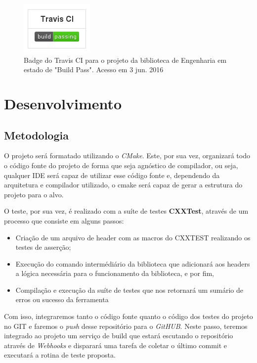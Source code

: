 \documentclass[
	article,			%
	12pt,				%
	oneside,			%
	a4paper,			%
	english,			
	brazil,
	sumario=tradicional
	]{abntex2}
\begin{document}
\begin{figure}[!h]
\centering
\includegraphics[scale=1]{images/travisci_badge.png}
\caption{Badge do Travis CI para o projeto da biblioteca de Engenharia em estado de "Build Pass". Acesso em 3 jun. 2016}
\label{travisci_badge}
\end{figure}


\pagebreak
\section{Desenvolvimento}


\subsection{Metodologia}

O projeto será formatado utilizando o \textit{CMake}. Este, por sua vez, organizará todo o código fonte do projeto de forma que seja agnóstico de compilador, ou seja, qualquer IDE será capaz de utilizar esse código fonte e, dependendo da arquitetura e compilador utilizado, o cmake será capaz de gerar a estrutura do projeto para o alvo. 

O teste, por sua vez, é realizado com a suíte de testes \textbf{CXXTest}, através de um processo que consiste em alguns passos:

\begin{itemize}
	\item{Criação de um arquivo de header com as macros do CXXTEST realizando os testes de asserção;}
	\item{Execução do comando intermédiário da biblioteca que adicionará aos headers a lógica necessária para o funcionamento da biblioteca, e por fim,}
	\item{Compilação e execução da suíte de testes que nos retornará um sumário de erros ou sucesso da ferramenta}
\end{itemize}

Com isso, integraremos tanto o código fonte quanto o código dos testes do projeto no GIT e faremos o \textit{push} desse repositório para o \textit{GitHUB}. Neste passo, teremos integrado ao projeto um serviço de build que estará escutando o repositório através de \textit{Webhooks} e disparará uma tarefa de coletar o último commit e executará a rotina de teste proposta.
\end{document}

